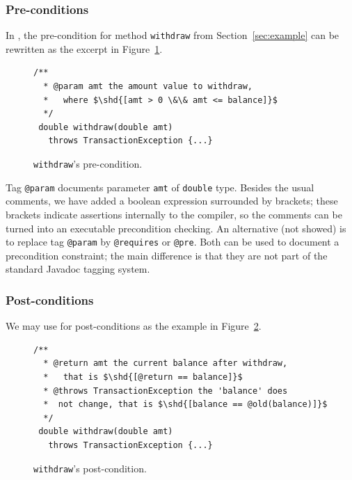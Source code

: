 \subsubsection{Pre-conditions}
In \contractjdoc, the pre-condition for method \lstinline!withdraw! from Section~\ref{sec:example} can be rewritten as the excerpt in Figure~\ref{fig:pre-example}.

\begin{figure}
\centering
\begin{lstlisting}[basicstyle=\footnotesize\ttfamily,name=figxpi, frame=lines, mathescape=true]
 /**
  * @param amt the amount value to withdraw, 
  *   where $\shd{[amt > 0 \&\& amt <= balance]}$
  */
 double withdraw(double amt) 
   throws TransactionException {...}
\end{lstlisting}
\caption{\texttt{withdraw}'s pre-condition.}
\label{fig:pre-example}
\end{figure}

Tag \lstinline!@param! documents parameter \lstinline!amt! of \lstinline!double! type.
Besides the usual comments, we have added a boolean expression
surrounded by brackets; these brackets indicate assertions internally to the \contractjdoc{} compiler, so the comments can be turned into an executable precondition checking.
An alternative (not showed) is to replace tag \lstinline!@param! by \lstinline!@requires! or \lstinline!@pre!. Both can be used to document a precondition constraint; the main difference is that they are not part of the standard Javadoc tagging system.

\subsubsection{Post-conditions}

We may use \contractjdoc{} for post-conditions as the example in Figure~\ref{fig:post-example}.


\begin{figure}
\centering
\begin{lstlisting}[basicstyle=\footnotesize\ttfamily,name=figxpi, frame=lines, mathescape=true]
 /**
  * @return amt the current balance after withdraw,
  *   that is $\shd{[@return == balance]}$
  * @throws TransactionException the 'balance' does
  *  not change, that is $\shd{[balance == @old(balance)]}$
  */
 double withdraw(double amt) 
   throws TransactionException {...}
\end{lstlisting}
\caption{\texttt{withdraw}'s post-condition.}
\label{fig:post-example}
\end{figure}

